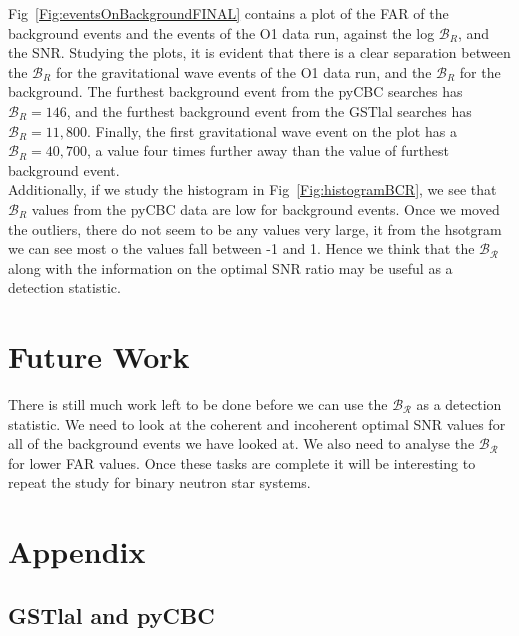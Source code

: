 \documentclass{article}
\begin{document}
  
  Fig~\ref{Fig:eventsOnBackgroundFINAL} contains a plot of the FAR of the background events and the events of the O1 data run, against the log  $\mathcal{B}_{R}$, and the SNR. Studying the plots, it is evident that there is a clear separation between the $\mathcal{B}_{R}$ for the gravitational wave events of the O1 data run, and the $\mathcal{B}_{R}$ for the background. The furthest background event from the pyCBC searches has $\mathcal{B}_{R} = 146$, and the furthest background event from the GSTlal searches has $\mathcal{B}_{R} = 11,800 $. Finally, the first gravitational wave event on the plot has a $\mathcal{B}_{R}= 40,700$, a value four times further away than the value of furthest background event. \\
  
  Additionally, if we study the histogram in Fig~\ref{Fig:histogramBCR}, we see that $\mathcal{B}_{R}$ values from the pyCBC data are low for background events. Once we moved the outliers, there do not seem to be any values very large, it from the hsotgram we can see most o the values fall between -1 and 1. Hence we think that the $\mathcal{B_{R}}$ along with the information on the optimal SNR ratio may be useful as a detection statistic.
  
  
 
 
 
 \section{Future Work }
There is still much work left to be done before we can use the $\mathcal{B_{R}}$ as a detection statistic. We need to look at the coherent and incoherent optimal SNR values for all of the background events we have looked at. We also need to analyse the $\mathcal{B_{R}}$ for lower FAR values. Once these tasks are complete it will be interesting to repeat the study for binary neutron star systems. 

   
   \section{Appendix}
   \subsection{GSTlal and pyCBC} \label{appendixGstlalandPycbc}
   
\end{document}
